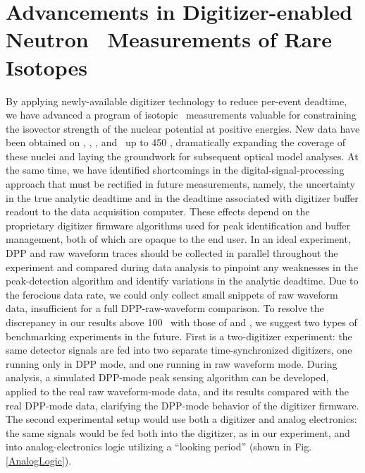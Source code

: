 \section{Advancements in Digitizer-enabled Neutron \tot\ Measurements of Rare
Isotopes}
By applying newly-available digitizer technology to reduce per-event deadtime,
we have advanced a program of isotopic \tot\ 
measurements valuable for constraining the isovector strength of the nuclear potential at positive 
energies. New data have been obtained on \oSixEight, \niEightFour, \rhThree, and \snTwelveFour\ up
to 450 \mega\electronvolt, dramatically expanding the coverage of these nuclei
and laying the groundwork for subsequent optical model analyses. At the same
time, we have identified shortcomings in the digital-signal-processing approach
that must be rectified in future measurements, namely, the uncertainty in the
true analytic deadtime and in the deadtime associated with digitizer buffer
readout to the data acquisition computer. These effects depend on
the proprietary digitizer firmware algorithms used for peak
identification and buffer management, both of which are opaque to the
end user. In an ideal experiment, DPP and raw waveform traces should be collected
in parallel throughout the experiment and compared during data analysis to
pinpoint any weaknesses in the peak-detection algorithm and identify variations in the analytic
deadtime. Due to the ferocious data rate, we could only
collect small snippets of raw waveform data, insufficient for a full
DPP-raw-waveform comparison.
To resolve the discrepancy in our results above 100
\mega\electronvolt\ with those of \cite{Finlay1993} and \cite{Abfalterer2001},
we suggest two types of benchmarking experiments in the future. First is a
two-digitizer experiment: the same detector signals are fed into two
separate time-synchronized digitizers, one running only in DPP mode,
and one running in raw waveform mode. During analysis, a simulated DPP-mode peak sensing
algorithm can be developed, applied to the real raw waveform-mode data, and its
results compared with the real DPP-mode data, clarifying the DPP-mode behavior of
the digitizer firmware. The second experimental setup would use
both a digitizer and analog electronics:
the same signals would be fed both into the digitizer, as
in our experiment, and into analog-electronics logic utilizing a ``looking
period'' (shown in Fig. \ref{AnalogLogic}).

